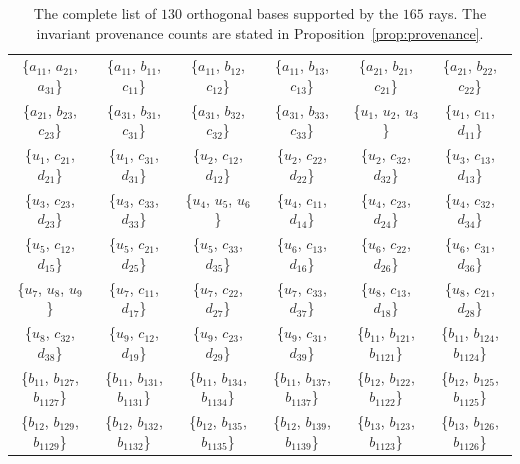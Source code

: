 \documentclass[%
  reprint,
  superscriptaddress,
  showkeys,
  amsmath,amssymb,
  aps,pra,
  longbibliography,
  floatfix,
  x11names
]{revtex4-2}
\begin{document}
\begin{table}[htbp!]
\caption{
The complete list of $130$ orthogonal bases supported by the $165$ rays.
The invariant provenance counts are stated in Proposition~\ref{prop:provenance}.
}
\label{tab:orthogonal_bases}
\begin{ruledtabular}
\begin{tabular}{*{6}{c}}

{\{$a_{11}$, $a_{21}$, $a_{31}$\}} & {\{$a_{11}$, $b_{11}$, $c_{11}$\}} & {\{$a_{11}$, $b_{12}$, $c_{12}$\}} & {\{$a_{11}$, $b_{13}$, $c_{13}$\}} & {\{$a_{21}$, $b_{21}$, $c_{21}$\}} & {\{$a_{21}$, $b_{22}$, $c_{22}$\}} \\
{\{$a_{21}$, $b_{23}$, $c_{23}$\}} & {\{$a_{31}$, $b_{31}$, $c_{31}$\}} & {\{$a_{31}$, $b_{32}$, $c_{32}$\}} & {\{$a_{31}$, $b_{33}$, $c_{33}$\}} & \{$u_{1}$, $u_{2}$, $u_{3}$\} & \{$u_{1}$, $c_{11}$, $d_{11}$\} \\
\{$u_{1}$, $c_{21}$, $d_{21}$\} & \{$u_{1}$, $c_{31}$, $d_{31}$\} & \{$u_{2}$, $c_{12}$, $d_{12}$\} & \{$u_{2}$, $c_{22}$, $d_{22}$\} & \{$u_{2}$, $c_{32}$, $d_{32}$\} & \{$u_{3}$, $c_{13}$, $d_{13}$\} \\
\{$u_{3}$, $c_{23}$, $d_{23}$\} & \{$u_{3}$, $c_{33}$, $d_{33}$\} & \{$u_{4}$, $u_{5}$, $u_{6}$\} & \{$u_{4}$, $c_{11}$, $d_{14}$\} & \{$u_{4}$, $c_{23}$, $d_{24}$\} & \{$u_{4}$, $c_{32}$, $d_{34}$\} \\
\{$u_{5}$, $c_{12}$, $d_{15}$\} & \{$u_{5}$, $c_{21}$, $d_{25}$\} & \{$u_{5}$, $c_{33}$, $d_{35}$\} & \{$u_{6}$, $c_{13}$, $d_{16}$\} & \{$u_{6}$, $c_{22}$, $d_{26}$\} & \{$u_{6}$, $c_{31}$, $d_{36}$\} \\
\{$u_{7}$, $u_{8}$, $u_{9}$\} & \{$u_{7}$, $c_{11}$, $d_{17}$\} & \{$u_{7}$, $c_{22}$, $d_{27}$\} & \{$u_{7}$, $c_{33}$, $d_{37}$\} & \{$u_{8}$, $c_{13}$, $d_{18}$\} & \{$u_{8}$, $c_{21}$, $d_{28}$\} \\
\{$u_{8}$, $c_{32}$, $d_{38}$\} & \{$u_{9}$, $c_{12}$, $d_{19}$\} & \{$u_{9}$, $c_{23}$, $d_{29}$\} & \{$u_{9}$, $c_{31}$, $d_{39}$\} & \{$b_{11}$, $b_{121}$, $b_{1121}$\} & \{$b_{11}$, $b_{124}$, $b_{1124}$\} \\
\{$b_{11}$, $b_{127}$, $b_{1127}$\} & \{$b_{11}$, $b_{131}$, $b_{1131}$\} & \{$b_{11}$, $b_{134}$, $b_{1134}$\} & \{$b_{11}$, $b_{137}$, $b_{1137}$\} & \{$b_{12}$, $b_{122}$, $b_{1122}$\} & \{$b_{12}$, $b_{125}$, $b_{1125}$\} \\
\{$b_{12}$, $b_{129}$, $b_{1129}$\} & \{$b_{12}$, $b_{132}$, $b_{1132}$\} & \{$b_{12}$, $b_{135}$, $b_{1135}$\} & \{$b_{12}$, $b_{139}$, $b_{1139}$\} & \{$b_{13}$, $b_{123}$, $b_{1123}$\} & \{$b_{13}$, $b_{126}$, $b_{1126}$\} \\

\end{tabular}
\end{ruledtabular}
\end{table}
\end{document}
